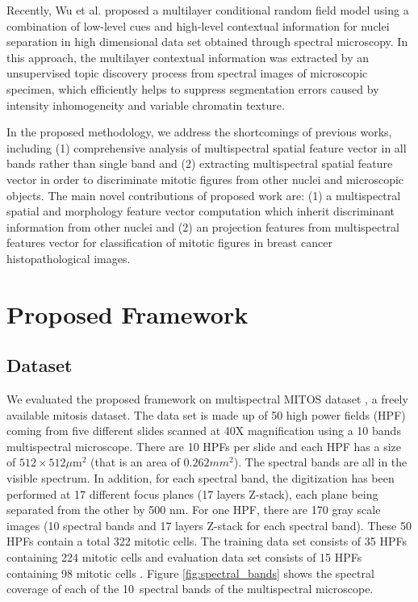 \documentclass[10pt,twocolumn,letterpaper]{article}
\begin{document}
Recently, Wu et al. \cite{wu2012} proposed a multilayer conditional random field model using a combination of low-level cues and high-level contextual information for nuclei separation in high dimensional data set obtained through spectral microscopy. In this approach, the multilayer contextual information was extracted by an unsupervised topic discovery process from spectral images of microscopic specimen, which efficiently helps to suppress segmentation errors caused by intensity inhomogeneity and variable chromatin texture.

In the proposed methodology, we address the shortcomings of previous works, including (1) comprehensive analysis of multispectral spatial feature vector in all bands rather than single band \cite{masood2009,wu2009,wu2012} and (2) extracting multispectral spatial feature vector in order to discriminate mitotic figures from other nuclei and microscopic objects. The main novel contributions of proposed work are: (1) a multispectral spatial and morphology feature vector computation which inherit discriminant information from other nuclei and (2) an projection features from multispectral features vector for classification of mitotic figures in breast cancer histopathological images.

\section{Proposed Framework}
\label{sec:framework}
\subsection{Dataset}

We evaluated the proposed framework on multispectral MITOS dataset \cite{mITOS2012}, a freely available mitosis dataset. The data set is made up of 50 high power fields (HPF) coming from five different slides scanned at 40X magnification using a 10 bands multispectral microscope. There are 10 HPFs per slide and each HPF has a size of $512\times512\mu\text{m}^2$ (that is an area of $0.262mm^2$). The spectral bands are all in the visible spectrum. In addition, for each spectral band, the digitization has been performed at 17 different focus planes (17 layers Z-stack), each plane being separated from the other by 500 nm. For one HPF, there are 170 gray scale images (10 spectral bands and 17 layers Z-stack for each spectral band). These 50 HPFs contain a total 322 mitotic cells. The training data set consists of 35 HPFs containing 224 mitotic cells and evaluation data set consists of 15 HPFs containing 98 mitotic cells \cite{roux2013}. Figure \ref{fig:spectral_bands} shows the spectral coverage of each of the 10~spectral bands of the multispectral microscope.
\end{document}
